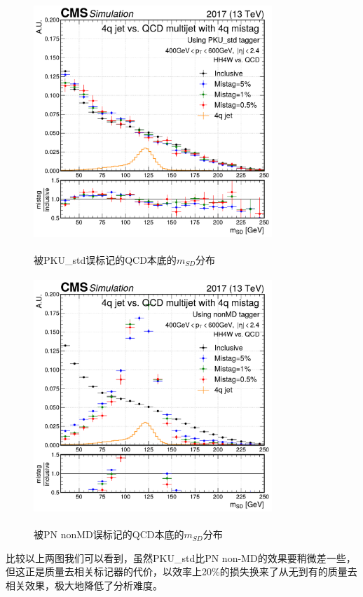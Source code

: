 \begin{figure}[H]
 \centering
 \caption{被PKU\_std误标记的QCD本底的$m_{SD}$分布}
 \includegraphics[height=9cm, width=9cm]{pictures/MD_PKU_std_4q.pdf}
 \label{fig:5.3}
\end{figure}

\begin{figure}[H]
 \centering
 \caption{被PN nonMD误标记的QCD本底的$m_{SD}$分布}
 \includegraphics[height=9cm, width=9cm]{pictures/MD_nonMD_4q.pdf}
 \label{fig:5.4}
\end{figure}

比较以上两图我们可以看到，虽然PKU\_std比PN non-MD的效果要稍微差一些，但这正是质量去相关标记器的代价，以效率上20\%的损失换来了从无到有的质量去相关效果，极大地降低了分析难度。

